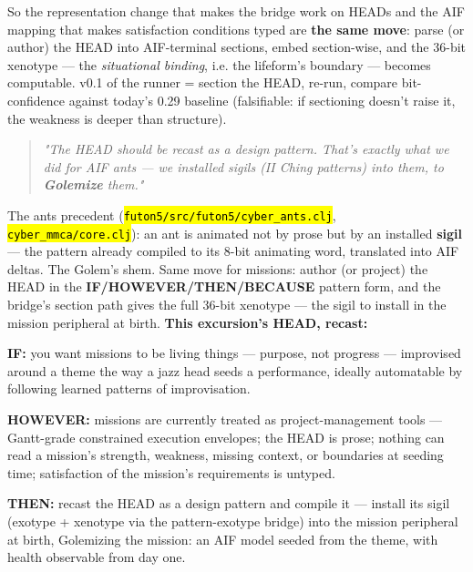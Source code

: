 \documentclass[11pt,oneside]{article}
\newcommand{\scopehl}[1]{\texttt{\hl{#1}}}
\begin{document}
\begin{phasebox}[title={3. DERIVE --- opened with a candidate runner (2026-06-10)}]
\begin{subbox}[title={3.2 The representation finding (the convergence)}]
So the representation change that makes the bridge work on HEADs and the AIF
mapping that makes satisfaction conditions typed are \textbf{the same move}: parse
(or author) the HEAD into AIF-terminal sections, embed section-wise, and the
36-bit xenotype --- the \emph{situational binding}, i.e. the lifeform's boundary ---
becomes computable. v0.1 of the runner = section the HEAD, re-run, compare
bit-confidence against today's 0.29 baseline (falsifiable: if sectioning
doesn't raise it, the weakness is deeper than structure).

\end{subbox}
\begin{subbox}[title={3.3 The recast (Joe steer, 2026-06-10): HEAD as design pattern --- Golemization}]

\begin{quote}\itshape
"The HEAD should be recast as a design pattern. That's exactly what we did
for AIF ants --- we installed sigils (II Ching patterns) into them, to
\textbf{Golemize} them."
\end{quote}

The ants precedent (\scopehl{futon5/src/futon5/cyber\_ants.clj}, \scopehl{cyber\_mmca/core.clj}):
an ant is animated not by prose but by an installed \textbf{sigil} --- the pattern
already compiled to its 8-bit animating word, translated into AIF deltas. The
Golem's shem. Same move for missions: author (or project) the HEAD in the
\textbf{IF/HOWEVER/THEN/BECAUSE} pattern form, and the bridge's section path gives
the full 36-bit xenotype --- the sigil to install in the mission peripheral at
birth. \textbf{This excursion's HEAD, recast:}

\textbf{IF:} you want missions to be living things --- purpose, not progress ---
improvised around a theme the way a jazz head seeds a performance, ideally
automatable by following learned patterns of improvisation.

\textbf{HOWEVER:} missions are currently treated as project-management tools ---
Gantt-grade constrained execution envelopes; the HEAD is prose; nothing can
read a mission's strength, weakness, missing context, or boundaries at
seeding time; satisfaction of the mission's requirements is untyped.

\textbf{THEN:} recast the HEAD as a design pattern and compile it --- install its
sigil (exotype + xenotype via the pattern-exotype bridge) into the mission
peripheral at birth, Golemizing the mission: an AIF model seeded from the
theme, with health observable from day one.


\end{subbox}
\end{phasebox}
\end{document}
